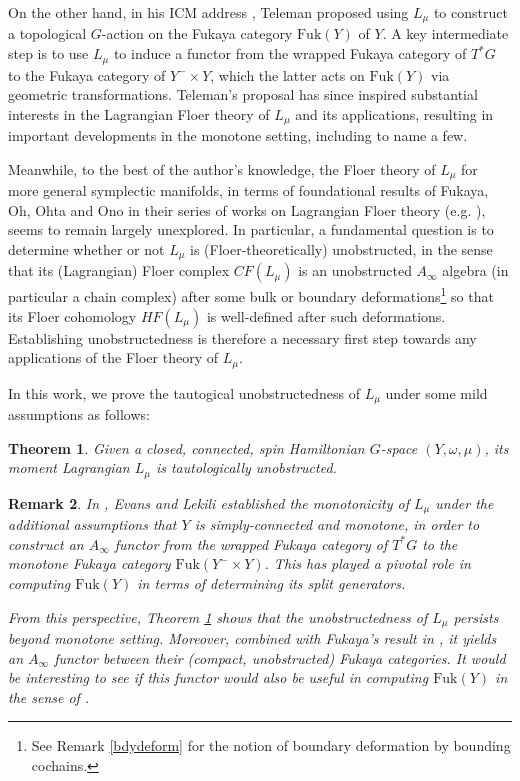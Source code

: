 \documentclass{amsart}
\newtheorem{theorem}{Theorem}[section]
\newtheorem{remark}[theorem]{Remark}
\numberwithin{equation}{section}
\begin{document}
On the other hand, in his ICM address \cite{Teleman}, Teleman proposed using $L_\mu$ to construct a 
topological $G$-action on the Fukaya category $\mathrm{Fuk}(Y)$ of $Y$. A key intermediate step is to use $L_\mu$ 
to induce a functor from the wrapped Fukaya category of $T^*G$ to the Fukaya category of $Y^-\times Y$, 
which the latter acts on $\mathrm{Fuk}(Y)$ via geometric transformations. Teleman's proposal has since inspired substantial interests in the Lagrangian Floer theory of $L_\mu$ and its applications, resulting in important developments in the monotone setting, including \cite{EL, BCL, Chowmomentcorr} to name a few.

Meanwhile, to the best of the author's knowledge, the Floer theory of $L_\mu$ for more general symplectic manifolds, in terms of foundational results of Fukaya, Oh, Ohta and Ono in their series of works on Lagrangian Floer theory (e.g. \cite{FOOO,foookuranishi}), seems to remain largely unexplored. In particular, a fundamental question is to determine whether or not $L_\mu$ is (Floer-theoretically) unobstructed, in the sense that its (Lagrangian) Floer complex $CF(L_\mu)$ is an unobstructed $A_\infty$ algebra (in particular a chain complex) after some bulk or boundary deformations\footnote{See Remark \ref{bdydeform} for the notion of boundary deformation by bounding cochains.} so that its Floer cohomology $HF(L_\mu)$ is well-defined after such deformations. Establishing unobstructedness is therefore a necessary first step towards any applications of the Floer theory of $L_\mu$.

In this work, we prove the tautogical unobstructedness of $L_\mu$ under some mild assumptions as follows:

\begin{theorem}\label{momentlagrangianunobstructed}
Given a closed, connected, spin Hamiltonian $G$-space $(Y, \omega, \mu)$, its moment Lagrangian $L_\mu$ is tautologically unobstructed. 
\end{theorem}

\begin{remark}
In \cite[Lemma 6.1.1]{EL}, Evans and Lekili established the monotonicity of $L_\mu$ under the additional assumptions that $Y$ is simply-connected and monotone, in order to construct an $A_\infty$ functor from the wrapped Fukaya category of $T^*G$ to the monotone Fukaya category $\mathrm{Fuk}(Y^- \times Y)$. This has played a pivotal role in computing $\mathrm{Fuk}(Y)$ in terms of determining its split generators. 

From this perspective, Theorem \ref{momentlagrangianunobstructed} shows that the unobstructedness of $L_\mu$ persists beyond monotone setting. Moreover, combined with Fukaya's result in \cite[Theorem 1.7]{Fukaya-corr}, it yields an $A_\infty$ functor between their (compact, unobstructed) Fukaya categories. It would be interesting to see if this functor would also be useful in computing $\mathrm{Fuk}(Y)$ in the sense of \cite{AFOOO}.
\end{remark}
\end{document}
